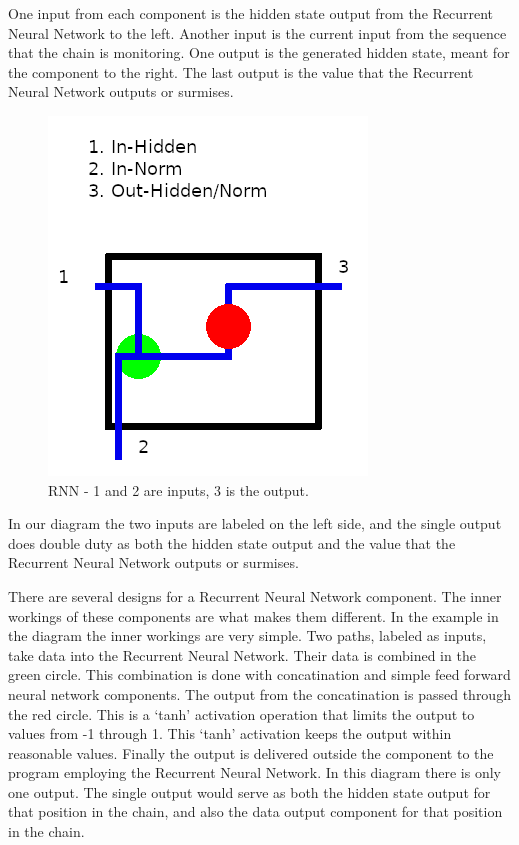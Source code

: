 One input from each component is the hidden state output from the Recurrent Neural Network to the left. Another input is the current input from the sequence that the chain is monitoring. One output is the generated hidden state, meant for the component to the right. The last output is the value that the Recurrent Neural Network outputs or surmises. 

\begin{figure}[H]
	\begin{center}
	
	\includegraphics[scale=0.5]{diagram-rnn}
		
\end{center}
	\caption[Recurrent Neural Network]{RNN - 1 and 2 are inputs, 3 is the output.}
	
\end{figure}

In our diagram the two inputs are labeled on the left side, and the single output does double duty as both the hidden state output and the value that the Recurrent Neural Network outputs or surmises.

There are several designs for a Recurrent Neural Network component. The inner workings of these components are what makes them different. In the example in the diagram the inner workings are very simple. Two paths, labeled as inputs, take data into the Recurrent Neural Network. Their data is combined in the green circle. This combination is done with concatination and simple feed forward neural network components. The output from the concatination is passed through the red circle. This is a `tanh' activation operation that limits the output to values from -1 through 1. This `tanh' activation keeps the output within reasonable values. Finally the output is delivered outside the component to the program employing the Recurrent Neural Network. In this diagram there is only one output. The single output would serve as both the hidden state output for that position in the chain, and also the data output component for that position in the chain.



